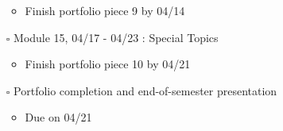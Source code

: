 \documentclass[
]{article}
\providecommand{\tightlist}{%
  \setlength{\itemsep}{0pt}\setlength{\parskip}{0pt}}
\begin{document}
\begin{itemize}
  \begin{itemize}
  \tightlist
  \item
    Finish portfolio piece 9 by 04/14
  \end{itemize}
\item[$\square$]
  Module 15, 04/17 - 04/23 : Special Topics

  \begin{itemize}
  \tightlist
  \item
    Finish portfolio piece 10 by 04/21
  \end{itemize}
\item[$\square$]
  Portfolio completion and end-of-semester presentation

  \begin{itemize}
  \tightlist
  \item
    Due on 04/21
  \end{itemize}
\end{itemize}
\end{document}
